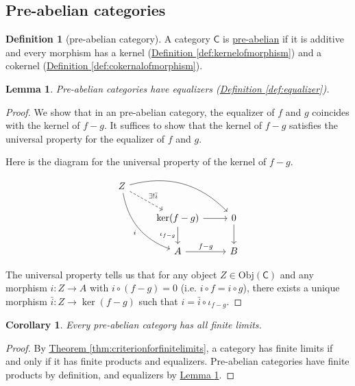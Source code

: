 \documentclass[a4paper,10pt]{scrreprt}
\newcommand{\defn}[1]{\ul{#1}}
\newcommand{\Obj}{\mathrm{Obj}}
\theoremstyle{definition}
\newtheorem{definition}{Definition}[section]
\theoremstyle{plain}
\newtheorem{lemma}{Lemma}[section]
\newtheorem{corollary}{Corollary}[section]
\theoremstyle{remark}
\begin{document}
\subsection{Pre-abelian categories} \label{sec:preabeliancategories}
\begin{definition}[pre-abelian category]
  \label{def:preabeliancategory}
  A category  $\mathsf{C}$ is \defn{pre-abelian} if it is additive and every morphism has a kernel (\hyperref[def:kernelofmorphism]{Definition \ref*{def:kernelofmorphism}}) and a cokernel (\hyperref[def:cokernalofmorphism]{Definition \ref*{def:cokernalofmorphism}}).
\end{definition}

\begin{lemma}
  \label{lemma:preabeliancategorieshaveequalizers}
  Pre-abelian categories have equalizers (\hyperref[def:equalizer]{Definition \ref*{def:equalizer}}).
\end{lemma}
\begin{proof}
  We show that in an pre-abelian category, the equalizer of $f$ and $g$ coincides with the kernel of $f - g$. It suffices to show that the kernel of $f - g$ satisfies the universal property for the equalizer of $f$ and $g$.

  Here is the diagram for the universal property of the kernel of $f - g$.
  \begin{equation*}
    \begin{tikzcd}
      Z
      \arrow[rrd, bend left]
      \arrow[ddr, bend right, swap, "i"]
      \arrow[dr, dashed, "\exists!\bar{i}"]
      \\
      & \ker(f - g)
      \arrow[d, swap, "\iota_{f - g}"]
      \arrow[r]
      & 0
      \arrow[d]
      \\
      & A
      \arrow[r, "f - g"]
      & B
    \end{tikzcd}
  \end{equation*}

  The universal property tells us that for any object $Z \in \Obj(\mathsf{C})$ and any morphism $i\colon Z \to A$ with $i \circ (f - g) = 0$ (i.e. $i \circ f = i \circ g$), there exists a unique morphism $\bar{i}\colon Z \to \ker(f - g)$ such that $i = \bar{i} \circ \iota_{f - g}$.
\end{proof}

\begin{corollary}
  Every pre-abelian category has all finite limits.
\end{corollary}
\begin{proof}
  By \hyperref[thm:criterionforfinitelimits]{Theorem \ref*{thm:criterionforfinitelimits}}, a category has finite limits if and only if it has finite products and equalizers. Pre-abelian categories have finite products by definition, and equalizers by \hyperref[lemma:preabeliancategorieshaveequalizers]{Lemma \ref*{lemma:preabeliancategorieshaveequalizers}}.
\end{proof}
\end{document}
